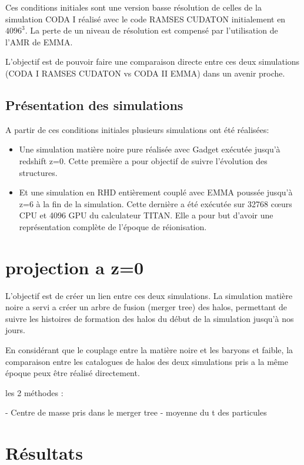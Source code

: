 Ces conditions initiales sont une version basse résolution de celles de la simulation CODA I%
réalisé avec le code RAMSES CUDATON %
initialement en $4096^3$.
La perte de un niveau de résolution est compensé par l'utilisation de l'AMR de EMMA.

L'objectif est de pouvoir faire une comparaison directe entre ces deux simulations (CODA I RAMSES CUDATON vs CODA II EMMA) dans un avenir proche.



\subsection{Présentation des simulations}

A partir de ces conditions initiales plusieurs simulations ont été réalisées:

\begin{itemize}
\item Une simulation matière noire pure réalisée avec Gadget %
exécutée jusqu'à redshift z=0.
Cette première a pour objectif de suivre l'évolution des structures.

\item Et une simulation en RHD entièrement couplé avec EMMA poussée jusqu'à z=6 à la fin de la simulation.
Cette dernière a été exécutée sur 32768 cœurs CPU et 4096 GPU du calculateur TITAN.
Elle a pour but d'avoir une représentation complète de l'époque de réionisation.
\end{itemize}



\section{projection a z=0}

L'objectif est de créer un lien entre ces deux simulations.
La simulation matière noire a servi a créer un arbre de fusion (merger tree) des halos, permettant de suivre les histoires de formation des halos du début de la simulation jusqu'à nos jours.

En considérant que le couplage entre la matière noire et les baryons et faible, la comparaison entre les catalogues de halos des deux simulations pris a la même époque peux être réalisé directement.


les 2 méthodes :

- Centre de masse pris dans le merger tree
- moyenne du t des particules



\section{Résultats}



